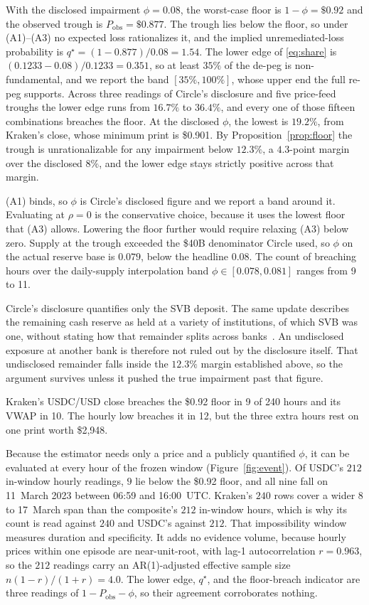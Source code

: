 With the disclosed impairment $\phi=0.08$, the worst-case floor is $1-\phi=\$0.92$ and the
observed trough is $P_{\mathrm{obs}}=\$0.877$. The trough lies below the floor, so under
(A1)--(A3) no expected loss rationalizes it, and the implied unremediated-loss probability
is $q^{\star}=(1-0.877)/0.08=1.54$. The lower edge of
\eqref{eq:share} is
$(0.1233-0.08)/0.1233=0.351$, so at least $35\%$ of the de-peg is non-fundamental, and we
report the band $[35\%,100\%]$, whose upper end the full re-peg supports. Across three
readings of Circle's disclosure and five price-feed troughs the lower edge runs from
$16.7\%$ to $36.4\%$, and every one of those fifteen combinations breaches the floor. At
the disclosed $\phi$, the lowest is $19.2\%$, from Kraken's close, whose minimum print
is \$0.901. By
Proposition~\ref{prop:floor} the trough is unrationalizable for any impairment below
$12.3\%$, a $4.3$-point margin over the disclosed $8\%$, and the lower edge stays strictly
positive across that margin.

(A1) binds, so $\phi$ is Circle's disclosed figure and we report a band around it.
Evaluating at $\rho=0$ is the conservative choice, because it uses the lowest floor that
(A3) allows. Lowering the floor further would require relaxing (A3) below zero. Supply
at the trough exceeded the \$40B denominator Circle used, so $\phi$ on the actual
reserve base is $0.079$, below the headline $0.08$. The count of breaching hours over the
daily-supply interpolation band $\phi\in[0.078,0.081]$ ranges from 9 to 11.

Circle's disclosure quantifies only the SVB deposit. The same update describes the
remaining cash reserve as held at a variety of institutions, of which SVB was one, without
stating how that remainder splits across banks~\cite{circle2023update}. An undisclosed
exposure at another bank is therefore not ruled out by the disclosure itself. That
undisclosed remainder falls inside the $12.3\%$ margin established above, so the argument
survives unless it pushed the true impairment past that figure.

Kraken's USDC/USD close breaches the \$0.92 floor in 9 of 240 hours and its VWAP in 10. The hourly low
breaches it in 12, but the three extra hours rest on one print worth \$2{,}948.

Because the estimator needs only a price and a publicly quantified $\phi$, it can be
evaluated at every hour of the frozen window (Figure~\ref{fig:event}). Of USDC's $212$
in-window hourly readings, $9$ lie below the \$0.92 floor, and all nine fall on 11~March
2023 between 06{:}59 and 16{:}00~UTC. Kraken's $240$ rows cover a wider 8 to 17~March
span than the composite's $212$ in-window hours, which is why its count is read against
$240$ and USDC's against $212$. That impossibility window measures duration and
specificity. It adds no evidence volume, because hourly prices within one episode are
near-unit-root, with lag-1 autocorrelation $r=0.963$, so the $212$ readings carry an
AR(1)-adjusted effective sample size $n(1-r)/(1+r)=4.0$. The lower edge, $q^{\star}$, and the
floor-breach indicator are three readings of $1-P_{\mathrm{obs}}-\phi$, so their agreement
corroborates nothing.
